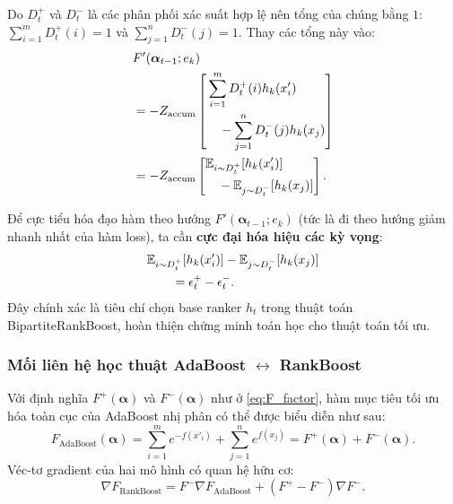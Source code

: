 \begin{morong}
Do $D^+_t$ và $D^-_t$ là các phân phối xác suất hợp lệ nên tổng của chúng bằng $1$: $\sum_{i=1}^m D^+_t(i) = 1$ và $\sum_{j=1}^n D^-_t(j) = 1$. Thay các tổng này vào:
\begin{align*}
    &F'(\bm{\alpha}_{t-1}; e_k) \\
    &= -Z_{\text{accum}}
    \left[
    \begin{aligned}
    &\sum_{i=1}^m D^+_t(i) h_k(x'_i) \\
    &\quad - \sum_{j=1}^n D^-_t(j) h_k(x_j)
    \end{aligned}
    \right] \\
    &= -Z_{\text{accum}}
    \left[
    \begin{aligned}
    &\mathbb{E}_{i \sim D^+_t}[h_k(x'_i)] \\
    &\quad - \mathbb{E}_{j \sim D^-_t}[h_k(x_j)]
    \end{aligned}
    \right].
\end{align*}

Để cực tiểu hóa đạo hàm theo hướng $F'(\bm{\alpha}_{t-1}; e_k)$ (tức là đi theo hướng giảm nhanh nhất của hàm loss), ta cần \textbf{cực đại hóa hiệu các kỳ vọng}:
\[
    \begin{aligned}
    &\mathbb{E}_{i \sim D^+_t}[h_k(x'_i)]
    -
    \mathbb{E}_{j \sim D^-_t}[h_k(x_j)] \\
    &\qquad = \epsilon^+_t - \epsilon^-_t.
    \end{aligned}
\]
Đây chính xác là tiêu chí chọn base ranker $h_t$ trong thuật toán BipartiteRankBoost, hoàn thiện chứng minh toán học cho thuật toán tối ưu.
\end{morong}

\subsubsection{Mối liên hệ học thuật AdaBoost $\leftrightarrow$ RankBoost}

Với định nghĩa $F^+(\bm{\alpha})$ và $F^-(\bm{\alpha})$ như ở \eqref{eq:F_factor}, hàm mục tiêu tối ưu hóa toàn cục của AdaBoost nhị phân có thể được biểu diễn như sau:
\begin{equation}
    F_{\text{AdaBoost}}(\bm{\alpha}) = \sum_{i=1}^m e^{-f(x'_i)} + \sum_{j=1}^n e^{f(x_j)} = F^+(\bm{\alpha}) + F^-(\bm{\alpha}).
\end{equation}
Véc-tơ gradient của hai mô hình có quan hệ hữu cơ:
\begin{equation}
    \nabla F_{\text{RankBoost}} = F^- \nabla F_{\text{AdaBoost}} + (F^+ - F^-)\nabla F^-.
    \label{eq:grad_relation}
\end{equation}

